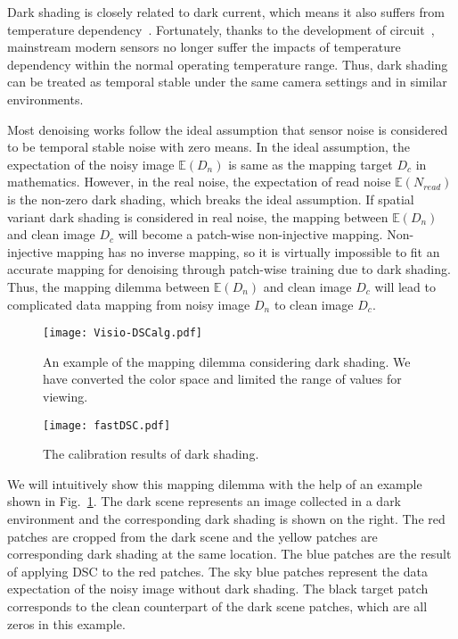 \documentclass[sigconf,screen,nonacm]{acmart}
\begin{document}
    Dark shading is closely related to dark current, which means it also suffers from temperature dependency~\cite{2011/CMOS,EMVA1288}. Fortunately, thanks to the development of circuit~\cite{AICSP19/CDS,PRIME14/CDS}, mainstream modern sensors no longer suffer the impacts of temperature dependency within the normal operating temperature range. Thus, dark shading can be treated as temporal stable under the same camera settings and in similar environments.
    
    Most denoising works follow the ideal assumption that sensor noise is considered to be temporal stable noise with zero means.
    In the ideal assumption, the expectation of the noisy image $\mathbb E(D_{n})$ is same as the mapping target $D_{c}$ in mathematics.
    However, in the real noise, the expectation of read noise $\mathbb E(N_{read})$ is the non-zero dark shading, which breaks the ideal assumption.
If spatial variant dark shading is considered in real noise, the mapping between $\mathbb E(D_{n})$ and clean image $D_{c}$ will become a patch-wise non-injective mapping.
Non-injective mapping has no inverse mapping, so it is virtually impossible to fit an accurate mapping for denoising through patch-wise training due to dark shading. Thus, the mapping dilemma between $\mathbb E(D_{n})$ and clean image $D_{c}$ will lead to complicated data mapping from noisy image $D_{n}$ to clean image $D_{c}$.

    \begin{figure}[t!]
        \texttt{[image: Visio-DSCalg.pdf]}
\caption{An example of the mapping dilemma considering dark shading. We have converted the color space and limited the range of values for viewing.}
        \label{fig:Mapping}
    \end{figure}
    
    \begin{figure}[t!]
\texttt{[image: fastDSC.pdf]}
        \caption{The calibration results of dark shading.}
        \label{fig:FastDSC}
    \end{figure}

    We will intuitively show this mapping dilemma with the help of an example shown in Fig.~\ref{fig:Mapping}.
    The dark scene represents an image collected in a dark environment and the corresponding dark shading is shown on the right.
    The red patches are cropped from the dark scene and the yellow patches are corresponding dark shading at the same location. The blue patches are the result of applying DSC to the red patches.
    The sky blue patches represent the data expectation of the noisy image without dark shading.
    The black target patch corresponds to the clean counterpart of the dark scene patches, which are all zeros in this example.
\end{document}
